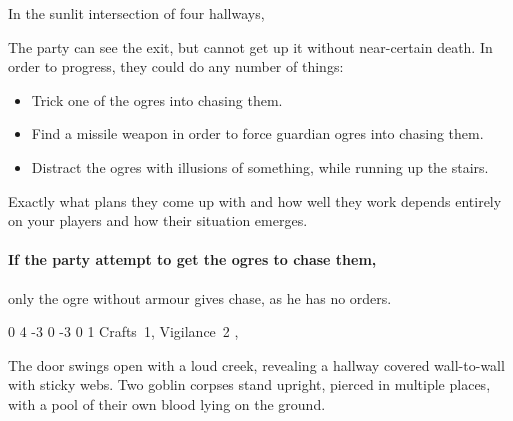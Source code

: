 \begin{multicols}{2}
\begin{boxtext}
	In the sunlit intersection of four hallways,
	\iftoggle{hardcore}%
		{three ogres sit playing a game of dice.  Two are clad in black leather armour, with a massive sword by their side.  One sucks on a horse's uncooked head, and the other chews the rest of the body.}%
		{two ogres sit playing a game of dice, one of which is clad in black, leather armour, with a massive sword by its side.}%

\end{boxtext}

The party can see the exit, but cannot get up it without near-certain death.
In order to progress, they could do any number of things:

\begin{itemize}

	\item{Trick one of the ogres into chasing them.}
	\item{Find a missile weapon in order to force guardian ogres into chasing them.}
	\item{Distract the ogres with illusions of something, while running up the stairs.}

\end{itemize}

Exactly what plans they come up with and how well they work depends entirely on your players and how their situation emerges.

\paragraph{If the party attempt to get the ogres to chase them,}
only the ogre without armour gives chase, as he has no orders.

\iftoggle{hardcore}{%
\npc{\N\T}{2 Guardian Ogres}
}{
\npc{\N\T}{Guardian Ogre}
}
{0}%
{4}%
{{-3}%
{0}%
{-3}}%
{0}%
{1}%
{Crafts~1, Vigilance~2}%
{\greatsword, \partialleather}%
{}

\label{chasingogre}


\begin{boxtext}

	The door swings open with a loud creek, revealing a hallway covered wall-to-wall with sticky webs.
	Two goblin corpses stand upright, pierced in multiple places, with a pool of their own blood lying on the ground.


\end{boxtext}
\end{multicols}

